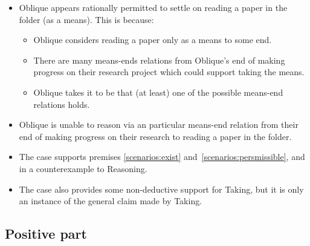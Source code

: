 \documentclass[10pt]{article}
\newcommand{\hozlinedash}[0]{%
  \noindent\hdashrule[0.5ex][c]{\textwidth}{.1pt}{2.5pt}
}
\newcommand{\schemaName}[1]{\textsf{#1}}
\begin{document}
\begin{itemize}
\item Oblique appears rationally permitted to settle on reading a paper in the folder (as a means).
  This is because:
  \begin{itemize}
  \item Oblique considers reading a paper only as a means to some end.
  \item There are many means-ends relations from Oblique's end of making progress on their research project which could support taking the means.
  \item Oblique takes it to be that (at least) one of the possible means-end relations holds.
  \end{itemize}
\item Oblique is unable to reason via an particular means-end relation from their end of making progress on their research to reading a paper in the folder.
\end{itemize}


\begin{itemize}
\item The case supports premises \ref{scenarios:exist} and~\ref{scenarios:persmissible}, and in a counterexample to \schemaName{Reasoning}.
\item The case also provides some non-deductive support for \schemaName{Taking}, but it is only an instance of the general claim made by \schemaName{Taking}.
\end{itemize}


\newpage

\subsection{Positive part}
\label{sec:positive-part}

\hozlinedash
\end{document}
